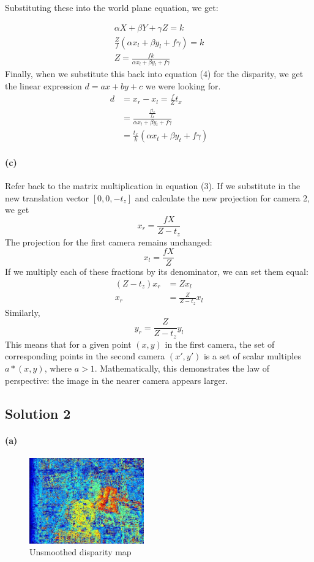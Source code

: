 \documentclass{article}
\newcommand{\solution}[1]{\clearpage \subsection*{Solution #1}}
\newcommand{\spart}[1]{\paragraph{(#1)}}
\begin{document}
Substituting these into the world plane equation, we get:

\begin{align}
\alpha X + \beta Y + \gamma Z = k \\
\frac{Z}{f}(\alpha x_l + \beta y_l + f \gamma) = k \\
Z = \frac{fk}{\alpha x_l + \beta y_l + f \gamma}
\end{align}
Finally, when we substitute this back into equation (4) for the disparity, we get the linear expression $d = ax+by+c$ we were looking for.
\begin{align}
d &= x_r - x_l = \frac{f}{Z}t_x \\
&= \frac{ \frac{ft_x}{f_k}}{\alpha x_t + \beta y_t + f \gamma} \\
&= \frac{t_x}{k}(\alpha x_t + \beta y_t + f \gamma)
\end{align}

\spart{c} Refer back to the matrix multiplication in equation (3). If we substitute in the new translation vector $[0,0,-t_z]$ and calculate the new projection for camera 2, we get
\begin{equation}
x_r = \frac{fX}{Z-t_z}
\end{equation}
The projection for the first camera remains unchanged:
\begin{equation}
x_l = \frac{fX}{Z}
\end{equation}
If we multiply each of these fractions by its denominator, we can set them equal:
\begin{align}
(Z-t_z)x_r &= Zx_l \\
x_r &= \frac{Z}{Z-t_z}x_l
\end{align}
Similarly,
\begin{equation}
y_r = \frac{Z}{Z-t_z}y_l
\end{equation}
This means that for a given point $(x,y)$ in the first camera, the set of corresponding points in the second camera $(x',y')$ is a set of scalar multiples $a*(x,y)$, where $a>1$. Mathematically, this demonstrates the law of perspective: the image in the nearer camera appears larger.

\solution{2} 

\spart{a}

\begin{figure}[!h]
  \centering
  \includegraphics[height=10em]{code/outputs/prob2a.jpg}
  \caption{Unsmoothed disparity map}
\end{figure}
\end{document}
